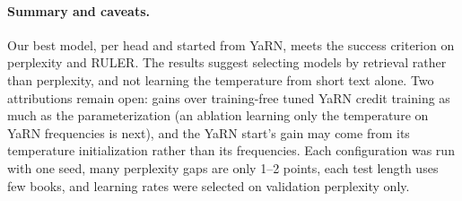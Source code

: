 \paragraph{Summary and caveats.}
Our best model, per head and started from YaRN, meets the success criterion on perplexity and RULER. The results suggest selecting models by retrieval rather than perplexity, and not learning the temperature from short text alone. Two attributions remain open: gains over training-free tuned YaRN credit training as much as the parameterization (an ablation learning only the temperature on YaRN frequencies is next), and the YaRN start's gain may come from its temperature initialization rather than its frequencies. Each configuration was run with one seed, many perplexity gaps are only 1--2 points, each test length uses few books, and learning rates were selected on validation perplexity only.

